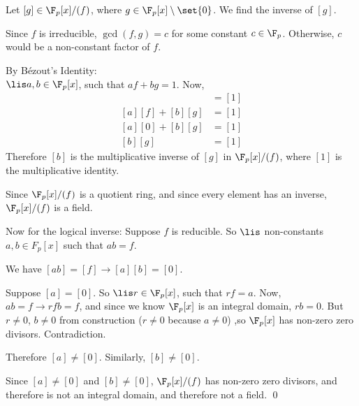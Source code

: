         Let $[g] \in \F_p[x]/(f)$, where $g \in \F_p[x] \setminus \set{0}$.
        We find the inverse of $[g]$.

        Since $f$ is irreducible, $\gcd(f, g) = c$ for some constant $c \in \F_p$.
        Otherwise, $c$ would be a non-constant factor of $f$.

        By Bézout's Identity: \\
        $\lis a, b \in \F_p[x]$, such that 
        $af + bg = 1$.
        Now, 
        \begin{align*}
            [af + bg] &= [1] \\
            [a][f] + [b][g] &= [1] \\
            [a][0] + [b][g] &= [1] \\
            [b][g] &= [1]
        \end{align*}
        Therefore $[b]$ is the multiplicative inverse of $[g]$ in $\F_p[x] / (f)$,
        where $[1]$ is the multiplicative identity.

        Since $\F_p[x] / (f)$ is a quotient ring, and since every element has an inverse,
        $\F_p[x] / (f)$ is a field.

        Now for the logical inverse: Suppose $f$ is reducible.
        So $\lis$ non-constants $a,b \in F_p[x]$ such that $ab = f$.
        
        We have
        \(
            [ab] = [f] \to
            [a][b] = [0]
        \).

        Suppose $[a] = [0]$.
        So $\lis r \in \F_p[x]$, such that $rf = a$.
        Now, $ab = f \to rfb = f$,
        and since we know $\F_p[x]$ is an integral domain, $rb = 0$.
        But $r \neq 0$, $b \neq 0$ from construction
        ($r\neq 0$ because $a \neq 0$)
        ,so $\F_p[x]$ has non-zero zero divisors.
        Contradiction.

        Therefore $[a] \neq [0]$.
        Similarly, $[b] \neq [0]$.

        Since $[a] \neq [0]$ and $[b] \neq [0]$, $\F_p[x] / (f)$ has non-zero zero divisors,
        and therefore is not an integral domain, 
        and therefore not a field.
        \qed
